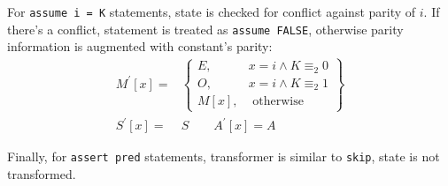 For \texttt{assume i = K} statements, state is checked for conflict against parity of $i$. If there's a conflict, statement is treated as  \texttt{assume FALSE}, otherwise parity information is augmented with constant's parity:
\begin{align*}
M^\prime[x] = & \left.
	\begin{cases}
		{E}, & x = i \wedge K \equiv_{2} 0 \\
		{O}, & x = i \wedge K \equiv_{2} 1 \\
		M[x], & \text{ otherwise}
	\end{cases}
\right\}\\
S^\prime[x] = & S \qquad
A^\prime[x] =  A
\end{align*}


Finally, for \texttt{assert pred} statements, transformer is similar to \texttt{skip}, state is not transformed.